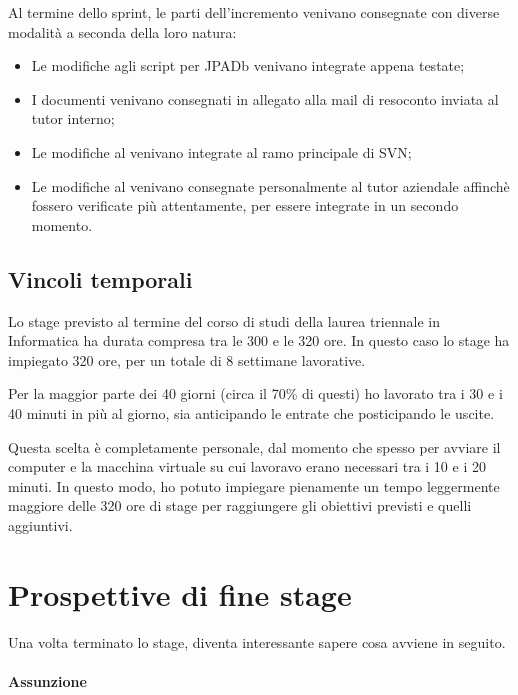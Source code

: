 Al termine dello sprint, le parti dell'incremento venivano consegnate con 
diverse modalità a seconda della loro natura:

\begin{itemize}
\item Le modifiche agli script per JPADb venivano integrate appena testate;
\item I documenti venivano consegnati in allegato alla mail di resoconto
  inviata al tutor interno;
\item Le modifiche al \BKEND{} venivano integrate al ramo principale di SVN;
\item Le modifiche al \FREND{} venivano consegnate personalmente al tutor
  aziendale affinchè fossero verificate più attentamente, per essere integrate
  in un secondo momento.
\end{itemize}

\subsection{Vincoli temporali}

Lo stage previsto al termine del corso di studi della laurea triennale in
Informatica ha durata compresa tra le 300 e le 320 ore. In questo caso lo
stage ha impiegato 320 ore, per un totale di 8 settimane lavorative.

Per la maggior parte dei 40 giorni (circa il 70\% di questi) ho lavorato tra i
30 e i 40 minuti in più al giorno, sia anticipando le entrate che posticipando
le uscite.

Questa scelta è completamente personale, dal momento che spesso per avviare il
computer e la macchina virtuale su cui lavoravo erano necessari tra i 10 e i
20 minuti. In questo modo, ho potuto impiegare pienamente un tempo leggermente
maggiore delle 320 ore di stage per raggiungere gli obiettivi previsti e
quelli aggiuntivi.

\section{Prospettive di fine stage}

Una volta terminato lo stage, diventa interessante sapere cosa avviene in
seguito.

\paragraph{Assunzione} \mbox{} \\


